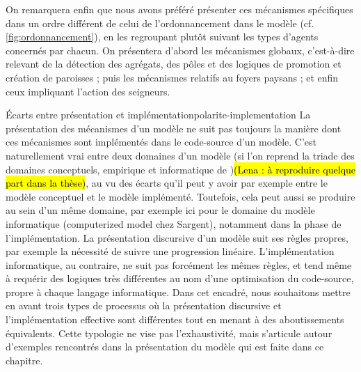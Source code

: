 
On remarquera enfin que nous avons préféré présenter ces mécanismes spécifiques dans un ordre différent de celui de l'ordonnancement dans le modèle (cf. \cref{fig:ordonnancement}), en les regroupant plutôt suivant les types d'agents concernés par chacun.
On présentera d'abord les mécanismes \og globaux\fg{}, c'est-à-dire relevant de la détection des agrégats, des pôles et des logiques de promotion et création de paroisses ; puis les mécanismes relatifs au foyers paysans ; et enfin ceux impliquant l'action des seigneurs.

\bigskip 
\begin{encadre}{Écarts entre présentation et implémentation}{polarite-implementation}
		\renewcommand{\thempfootnote}{\alph{mpfootnote}}
La présentation des mécanismes d'un modèle ne suit pas toujours la manière dont ces mécanismes sont implémentés dans le code-source d'un modèle.
C'est naturellement vrai entre deux \og domaines\fg{} d'un modèle (si l'on reprend la triade des domaines conceptuels, empirique et informatique de \textcite[\ppno~3, fig. 2]{sargent2009verification})\hl{(Lena : à reproduire quelque part dans la thèse)}, au vu des écarts qu'il peut y avoir par exemple entre le modèle conceptuel et le modèle implémenté.
Toutefois, cela peut aussi se produire au sein d'un même domaine, par exemple ici pour le domaine du modèle informatique (\og computerized model\fg{} chez Sargent), notamment dans la phase de l'implémentation.
La présentation discursive d'un modèle suit ses règles propres, par exemple la nécessité de suivre une progression linéaire.
L'implémentation informatique, au contraire, ne suit pas forcément les mêmes règles, et tend même à requérir des logiques très différentes au nom d'une \og optimisation\fg{} du code-source, propre à chaque langage informatique.
Dans cet encadré, nous souhaitons mettre en avant trois types de processus où la présentation discursive et l'implémentation effective sont différentes tout en menant à des aboutissements équivalents.
Cette typologie ne vise pas l'exhaustivité, mais s'articule autour d'exemples rencontrés dans la présentation du modèle qui est faite dans ce chapitre.


\end{encadre}
